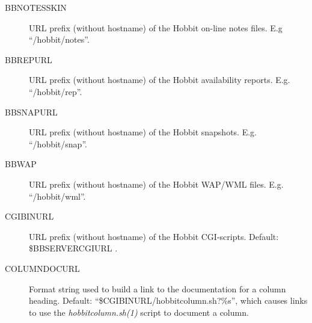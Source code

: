 \begin{description}
 

\item[BBNOTESSKIN] URL prefix (without hostname) of the Hobbit on-line notes files. E.g ``/hobbit/notes''. 

 

\item[BBREPURL] URL prefix (without hostname) of the Hobbit availability reports. E.g. ``/hobbit/rep''. 

 

\item[BBSNAPURL] URL prefix (without hostname) of the Hobbit snapshots. E.g. ``/hobbit/snap''. 

 

\item[BBWAP] URL prefix (without hostname) of the Hobbit WAP/WML files. E.g. ``/hobbit/wml''. 

 

\item[CGIBINURL] URL prefix (without hostname) of the Hobbit CGI-scripts. Default: \$BBSERVERCGIURL . 

 

\item[COLUMNDOCURL] Format string used to build a link to the documentation for a column heading. Default: ``\$CGIBINURL/hobbitcolumn.sh?\%s'', which causes links to use the \emph{hobbitcolumn.sh(1)}
 script to document a column. 

 


 


\end{description}
